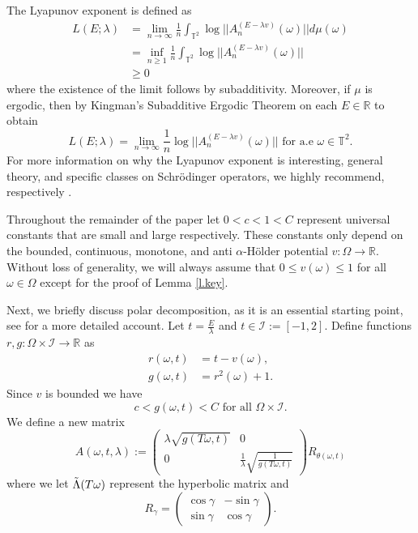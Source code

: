 \documentclass{amsart}
\newcommand{\RR}{\mathbb{R}}
\newcommand{\TT}{\mathbb{T}}
\newcommand{\I}{\mathcal{I}}
\begin{document}
The Lyapunov exponent is defined as
\begin{align}
    L(E; \lambda) &= \lim_{n\rightarrow \infty} \frac{1}{n}\int_{\TT^2} \log||A^{(E-\lambda v)}_n(\omega)|| d\mu(\omega)\\
    &= \inf_{n\geq 1} \frac{1}{n}\int_{\TT^2} \log||A^{(E-\lambda v)}_n(\omega)||  \nonumber \\
    &\geq 0 \nonumber
\end{align}
where the existence of the limit follows by subadditivity. Moreover, if $\mu$ is ergodic, then by Kingman's Subadditive Ergodic Theorem on each $E\in \RR$ to obtain
\[L(E;\lambda) = \lim_{n\rightarrow \infty}\frac{1}{n}\log||A^{(E-\lambda v)}_n(\omega)||\text{ for a.e } \omega\in \TT^2.\]
For more information on why the Lyapunov exponent is interesting, general theory, and specific classes on Schr\"odinger operators, we highly recommend, respectively \cite{wilkinson, DJ1, DJ2}. 

Throughout the remainder of the paper let $0<c<1<C$ represent universal constants that are small and large respectively. These constants only depend on the bounded, continuous, monotone, and anti $\alpha$-H\"older potential $v:\Omega \rightarrow \RR$. Without loss of generality, we will always assume that $0\leq v(\omega)\leq 1$ for all $\omega\in \Omega$ except for the proof of Lemma \ref{l.key}. 

Next, we briefly discuss polar decomposition, as it is an essential starting point, see \cite{zhenghe2} for a more detailed account. Let $t = \frac{E}{\lambda}$ and $t\in \I := [-1, 2]$. Define functions $r,g: \Omega\times \I \rightarrow \RR$ as
\begin{align*}
    r(\omega, t) &= t - v(\omega),\\
    g(\omega, t) &= r^2(\omega) + 1.
\end{align*}
Since $v$ is bounded we have
\[c < g(\omega,t) < C \text{ for all } \Omega\times \I.\]
We define a new matrix
\begin{equation}\label{e.coc}
    A(\omega, t, \lambda):=  \begin{pmatrix}
    \lambda \sqrt{g(T\omega, t)} & 0 \\
    0 & \frac{1}{\lambda} \sqrt{\frac{1}{g(T\omega, t)}}
\end{pmatrix}R_{\theta(\omega, t)}
\end{equation}
where we let $\Tilde{\Lambda}(T\omega)$ represent the hyperbolic matrix and
\[R_\gamma = \begin{pmatrix}
    \cos\gamma & -\sin\gamma\\
    \sin\gamma & \cos\gamma
\end{pmatrix}.\]
\end{document}
